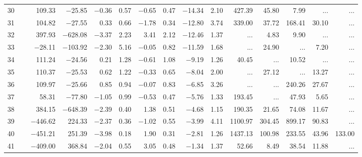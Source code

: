 \begin{table*}[p]
{\begin{tabular}{l@{ }r@{ \ }rr@{ \ }rr@{ \ }rrrr@{ \ }r@{ \ }r@{ \ }r@{ \ }r}
 30   \ \dotfill \  &    109.33 &   $-$25.85 &  $-$0.36 &   0.57 &  $-$0.65 &   0.47
 & $-$14.34 &   2.10
  &      427.39 &       45.80 &        7.99 &    ...     &    ...       \\     
 31   \ \dotfill \  &    104.82 &   $-$27.55 &    0.33 &   0.66 &  $-$1.78 &   0.34
 & $-$12.80 &   3.74
  &      339.00 &       37.72 &      168.41 &       30.10 &    ...       \\     
 32   \ \dotfill \  &    397.93 &  $-$628.08 &  $-$3.37 &   2.23 &    3.41 &   2.12
 & $-$12.46 &   1.37
  &    ...     &        4.83 &        9.90 &    ...     &    ...       \\     
 33   \ \dotfill \  &   $-$28.11 &  $-$103.92 &  $-$2.30 &   5.16 &  $-$0.05 &   0.82
 & $-$11.59 &   1.68
  &    ...     &       24.90 &    ...     &        7.20 &    ...       \\     
 34   \ \dotfill \  &    111.24 &   $-$24.56 &    0.21 &   1.28 &  $-$0.61 &   1.08
 &  $-$9.19 &   1.26
  &       40.45 &    ...     &       10.52 &    ...     &    ...       \\     
 35   \ \dotfill \  &    110.37 &   $-$25.53 &    0.62 &   1.22 &  $-$0.33 &   0.65
 &  $-$8.04 &   2.00
  &    ...     &       27.12 &    ...     &       13.27 &    ...       \\     
 36   \ \dotfill \  &    109.97 &   $-$25.66 &    0.85 &   0.94 &  $-$0.07 &   0.83
 &  $-$6.85 &   3.26
  &    ...     &    ...     &      240.26 &       27.67 &    ...       \\     
 37   \ \dotfill \  &     58.31 &   $-$77.80 &  $-$1.05 &   0.99 &  $-$0.53 &   0.47
 &  $-$5.76 &   1.33
  &      193.45 &    ...     &       47.93 &        5.65 &    ...       \\     
38   \ \dotfill \  &    384.15 &  $-$648.39 &  $-$2.39 &   0.40 &    1.38 &   0.51
 &  $-$4.68 &   1.15
  &      190.35 &       21.65 &       74.08 &       11.67 &    ...       \\     
 39   \ \dotfill \  &  $-$446.62 &    224.33 &  $-$2.37 &   0.36 &  $-$1.02 &   0.55
 &  $-$3.99 &   4.11
  &     1100.97 &      304.45 &      899.17 &       90.83 &    ...       \\     
 40   \ \dotfill \  &  $-$451.21 &    251.39 &  $-$3.98 &   0.18 &    1.90 &   0.31
 &  $-$2.81 &   1.26
  &     1437.13 &      100.98 &      233.55 &       43.96 &      133.00   \\     
 41   \ \dotfill \  &  $-$409.00 &    368.84 &  $-$2.04 &   0.55 &    3.05 &   0.48
 &  $-$1.34 &   1.37
  &       52.66 &        8.49 &       38.54 &       11.88 &    ...       \\     

\end{tabular}}
\end{table*}

